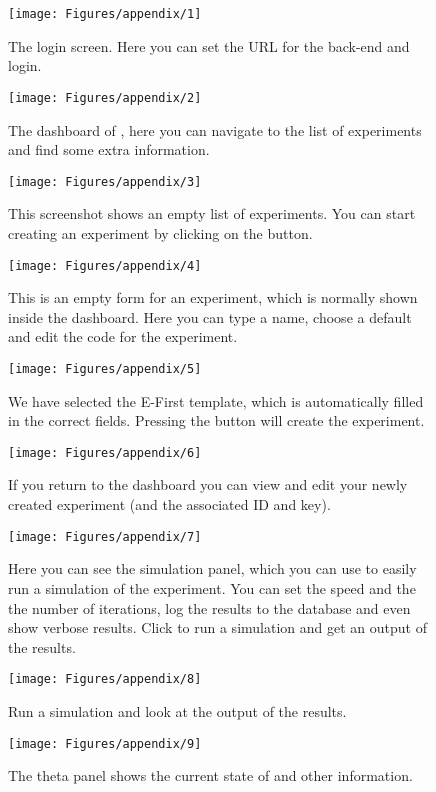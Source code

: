 \documentclass[nojss]{jss}
\begin{document}
\begin{figure}[H]
  \centering
  \texttt{[image: Figures/appendix/1]}
  \caption{The login screen. Here you can set the URL for the back-end and login.}
  \label{A1}
\end{figure}

\begin{figure}[H]
  \centering
    \texttt{[image: Figures/appendix/2]}
    \caption{The dashboard of , here you can navigate to the list of experiments and find some extra information.}
    \label{A2}
\end{figure}

\begin{figure}[H]
  \centering
    \texttt{[image: Figures/appendix/3]}
     \caption{This screenshot shows an empty list of experiments. You can start creating an experiment by clicking on the  button.}
    \label{A3}
\end{figure}
\begin{figure}[H]
  \centering
    \texttt{[image: Figures/appendix/4]}
     \caption{This is an empty form for an experiment, which is normally shown inside the dashboard. Here you can type a name, choose a default and edit the code for the experiment.}
    \label{A4}
\end{figure}
\begin{figure}[H]
  \centering
    \texttt{[image: Figures/appendix/5]}
     \caption{We have selected the E-First template, which is automatically filled in the correct fields. Pressing the  button will create the experiment.}
    \label{A5}
\end{figure}
\begin{figure}[H]
  \centering
    \texttt{[image: Figures/appendix/6]}
     \caption{If you return to the dashboard you can view and edit your newly created experiment (and the associated ID and key).}
    \label{A6}
\end{figure}
\begin{figure}[H]
  \centering
    \texttt{[image: Figures/appendix/7]}
     \caption{Here you can see the simulation panel, which you can use to easily run a simulation of the experiment. You can set the speed and the the number of iterations, log the results to the database and even show verbose results. Click  to run a simulation and get an output of the results.}
    \label{A7}
\end{figure}
\begin{figure}[H]
  \centering
    \texttt{[image: Figures/appendix/8]}
     \caption{Run a simulation and look at the output of the results.}
    \label{A8}
\end{figure}
\begin{figure}[H]
  \centering
    \texttt{[image: Figures/appendix/9]}
     \caption{The theta panel shows the current state of  and other information.}
    \label{A9}
\end{figure}
\end{document}
